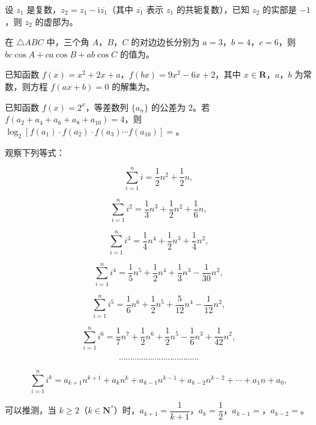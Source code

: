 \begin{question}
设 $z_1$ 是复数，$z_2=z_1-\mathrm i\overline{z_1}$（其中 $\overline{z_1}$ 表示 $z_1$ 的共轭复数），已知 $z_2$ 的实部是 $-1$，则 $z_2$ 的虚部为\gkblank{}。

\end{question}
\begin{question}
在 $\triangle ABC$ 中，三个角 $A$，$B$，$C$ 的对边边长分别为 $a=3$，$b=4$，$c=6$，则 $bc\cos A+ca\cos B+ab\cos C$ 的值为\gkblank{}。

\end{question}
\begin{question}
已知函数 $f(x)=x^2+2x+a$，$f(bx)=9x^2-6x+2$，其中 $x\in\mathbf R$，$a$，$b$ 为常数，则方程 $f(ax+b)=0$ 的解集为\gkblank{}。

\end{question}
\begin{question}
已知函数 $f(x)=2^x$，等差数列 $\{a_n\}$ 的公差为 $2$。若 $f(a_2+a_4+a_6+a_8+a_{10})=4$，则 $\log_2[f(a_1)\cdot f(a_2)\cdot f(a_3)\cdots f(a_{10})]=$\gkblank{}。

\end{question}
\begin{question}
观察下列等式：

\nopagebreak[4]
\[\sum_{i=1}^ni=\frac12n^2+\frac12n,\]

\nopagebreak[4]
\[\sum_{i=1}^ni^2=\frac13n^3+\frac12n^2+\frac16n,\]

\nopagebreak[4]
\[\sum_{i=1}^ni^3=\frac14n^4+\frac12n^3+\frac14n^2,\]

\nopagebreak[4]
\[\sum_{i=1}^ni^4=\frac15n^5+\frac12n^4+\frac13n^3-\frac1{30}n^2,\]

\nopagebreak[4]
\[\sum_{i=1}^ni^5=\frac16n^6+\frac12n^5+\frac5{12}n^4-\frac1{12}n^2,\]

\nopagebreak[4]
\[\sum_{i=1}^ni^6=\frac17n^7+\frac12n^6+\frac12n^5-\frac16n^3+\frac1{42}n^2,\]

\nopagebreak[4]
\[\cdots\cdots\cdots\cdots\cdots\cdots\cdots\cdots\cdots\cdots\cdots\cdots\]

\nopagebreak[4]
\[\sum_{i=1}^ni^k=a_{k+1}n^{k+1}+a_kn^k+a_{k-1}n^{k-1}+a_{k-2}n^{k-2}+\cdots+a_1n+a_0,\]

可以推测，当 $k\geqslant2$（$k\in\mathbf N^*$）时，$a_{k+1}=\dfrac1{k+1}$，$a_k=\dfrac12$，$a_{k-1}=$\gkblank{}，$a_{k-2}=$\gkblank{}。

\end{question}

